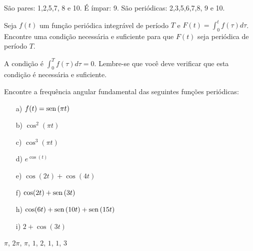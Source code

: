\begin{resp}
São pares: 1,2,5,7, 8 e 10. É ímpar: 9. São periódicas: 2,3,5,6,7,8, 9 e 10. 
\end{resp}
\begin{exer}Seja $f(t)$ um função periódica integrável de período $T$ e $F(t)=\int_0^tf(\tau)d\tau$. Encontre uma condição necessária e suficiente para que $F(t)$ seja periódica de período $T$.
\end{exer}
\begin{resp}
 A condição é $\int_0^Tf(\tau)d\tau=0$. Lembre-se que você deve verificar que esta condição é necessária e suficiente.
\end{resp}
 \begin{exer}{\label{freq_fund}} Encontre a frequência angular fundamental das seguintes funções periódicas:
\begin{itemize}
\item [a)] $f(t)= \operatorname{sen}\,(\pi t)$
\item [b)] $\cos^2(\pi t)$
\item [c)] $\cos^3(\pi t)$
\item [d)] $e^{\cos(t)}$
\item [e)] $\cos(2t)+\cos(4t)$
\item [f)] $\cos(2t)+\operatorname{sen}\,(3t)$
\item [h)] $\cos(6t)+\operatorname{sen}\,(10t)+\operatorname{sen}\,(15t)$
\item [i)] $2+\cos(3t)$
\end{itemize}
\end{exer}
\begin{resp}
$\pi$, $2\pi$, $\pi$, $1$, $2$, $1$, $1$, $3$
\end{resp}

